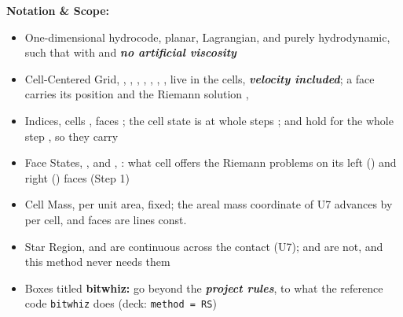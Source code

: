\documentclass[11pt,addpoints]{exam}
\begin{document}
\begin{tcolorbox}[breakable]
\textbf{Notation \& Scope:}\vspace{.5em}
\begin{itemize}
\item One-dimensional hydrocode, planar, Lagrangian, and purely hydrodynamic, such that \hspace{3mm}  \hspace{5mm} with  and \textbf{\emph{no artificial viscosity}}\vspace{.5em}
\item Cell-Centered Grid, \hspace{3mm} \bm{$\rho$}, , , , , , ,  \hspace{2mm} live in the cells, \textbf{\emph{velocity included}}; \hspace{3mm} a face carries its position  and the Riemann solution , \vspace{.5em}
\item Indices, \hspace{3mm} cells , faces ; \hspace{2mm} the cell state is at whole steps ; \hspace{2mm}  and  hold for the whole step , so they carry \vspace{.5em}
\item Face States, \hspace{3mm} ,  and , : what cell  offers the Riemann problems on its left () and right () faces (Step 1)\vspace{.5em}
\item Cell Mass, \hspace{3mm}  \hspace{2mm} per unit area, fixed; \hspace{2mm} the areal mass coordinate  of U7 advances by  per cell, and faces are lines  const.\vspace{.5em}
\item Star Region, \hspace{3mm}  and  are continuous across the contact (U7);  and  are not, and this method never needs them\vspace{.5em}
\item Boxes titled \textbf{bitwhiz:} go beyond the \textbf{\emph{project rules}}, to what the reference code \texttt{bitwhiz} does (deck: \texttt{method = RS})
\end{itemize}
\end{tcolorbox}
\end{document}
